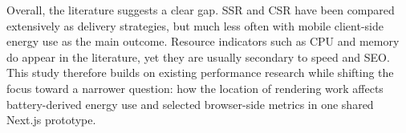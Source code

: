 Overall, the literature suggests a clear gap. SSR and CSR have been compared extensively as delivery strategies, but much less often with mobile client-side energy use as the main outcome. Resource indicators such as CPU and memory do appear in the literature, yet they are usually secondary to speed and SEO. This study therefore builds on existing performance research while shifting the focus toward a narrower question: how the location of rendering work affects battery-derived energy use and selected browser-side metrics in one shared Next.js prototype.
